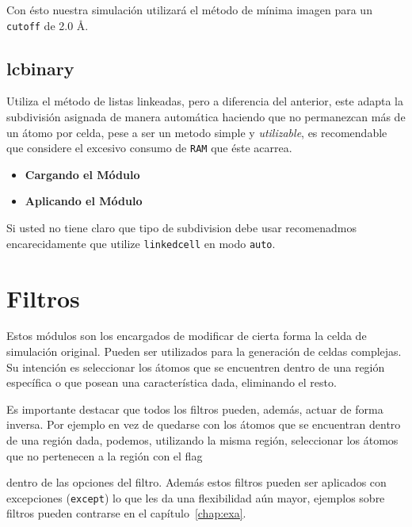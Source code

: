 Con \'esto nuestra simulaci\'on utilizar\'a el m\'etodo de m\'inima imagen para un \verb|cutoff| de 2.0 \AA.

\subsection{lcbinary}
Utiliza el m\'etodo de listas linkeadas, pero a diferencia del anterior, este adapta la subdivisi\'on asignada de manera autom\'atica haciendo que no permanezcan m\'as de un \'atomo por celda, pese a ser un metodo simple y \textit{utilizable}, es recomendable que considere el excesivo consumo de \verb|RAM| que \'este acarrea.

\begin{itemize}
 \item \textbf{Cargando el M\'odulo}
 \item \textbf{Aplicando el M\'odulo}
\end{itemize}

Si usted no tiene claro que tipo de subdivision debe usar recomenadmos encarecidamente que utilize \verb|linkedcell| en modo \verb|auto|.
\section{Filtros}
Estos m\'odulos son los encargados de modificar de cierta forma la celda de simulaci\'on original. Pueden ser utilizados para la generaci\'on de celdas complejas. Su intenci\'on es seleccionar los \'atomos que se encuentren dentro de una regi\'on espec\'ifica o que posean una caracter\'istica dada, eliminando el resto.

Es importante destacar que todos los filtros pueden, adem\'as, actuar de forma inversa. Por ejemplo en vez de quedarse con los \'atomos que se encuentran dentro de una regi\'on dada, podemos, utilizando la misma regi\'on, seleccionar los \'atomos que no pertenecen a la regi\'on con el flag


dentro de las opciones del filtro. Adem\'as estos filtros pueden ser aplicados con excepciones (\verb|except|) lo que les da una flexibilidad a\'un mayor, ejemplos sobre filtros pueden contrarse en el cap\'itulo~\ref{chap:exa}.

